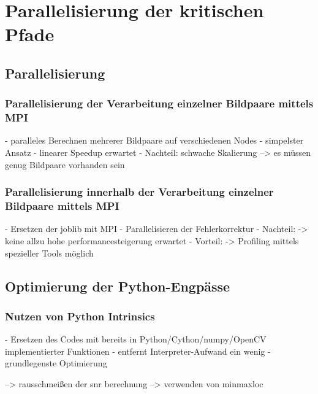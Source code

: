 \chapter{Parallelisierung der kritischen Pfade}


\section{Parallelisierung}

\subsection{Parallelisierung der Verarbeitung einzelner Bildpaare mittels MPI}

\begin{correctmore}
	- paralleles Berechnen mehrerer Bildpaare auf verschiedenen Nodes
	- simpelster Ansatz
	- linearer Speedup erwartet
	- Nachteil: schwache Skalierung --> es müssen genug Bildpaare vorhanden sein
\end{correctmore}

\subsection{Parallelisierung innerhalb der Verarbeitung einzelner Bildpaare mittels MPI}

\begin{correctmore}
	- Ersetzen der joblib mit MPI
	- Parallelisieren der Fehlerkorrektur
	- Nachteil:
		-> keine allzu hohe performancesteigerung erwartet
	- Vorteil:
		-> Profiling mittels spezieller Tools möglich
\end{correctmore}


\section{Optimierung der Python-Engpässe}

\subsection{Nutzen von Python Intrinsics}

\begin{correctmore}
	- Ersetzen des Codes mit bereits in Python/Cython/numpy/OpenCV implementierter Funktionen
	- entfernt Interpreter-Aufwand ein wenig
	- grundlegenste Optimierung
	
	--> rausschmeißen der snr berechnung
	--> verwenden von minmaxloc
\end{correctmore}


